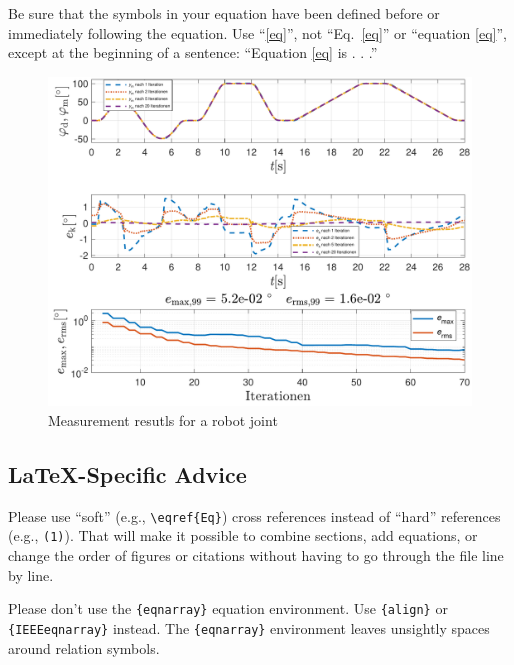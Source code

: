 \documentclass[conference]{IEEEtran}
\begin{document}
Be sure that the 
symbols in your equation have been defined before or immediately following 
the equation. Use ``\eqref{eq}'', not ``Eq.~\eqref{eq}'' or ``equation \eqref{eq}'', except at 
the beginning of a sentence: ``Equation \eqref{eq} is . . .''

\begin{figure}[htbp]
\centerline{\includegraphics[scale=.7]{./pictures/dSpace_Messung_ILC_DR70_Shruti.pdf}}
\caption{Measurement resutls for a robot joint}
\label{fig:ILC70Shruti}
\end{figure}

\subsection{\LaTeX-Specific Advice}

Please use ``soft'' (e.g., \verb|\eqref{Eq}|) cross references instead
of ``hard'' references (e.g., \verb|(1)|). That will make it possible
to combine sections, add equations, or change the order of figures or
citations without having to go through the file line by line.

Please don't use the \verb|{eqnarray}| equation environment. Use
\verb|{align}| or \verb|{IEEEeqnarray}| instead. The \verb|{eqnarray}|
environment leaves unsightly spaces around relation symbols.
\end{document}
